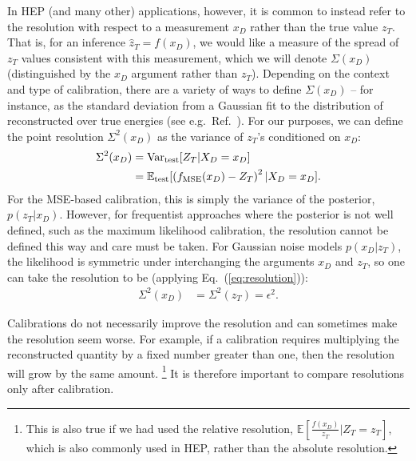 \documentclass[aps,prd,reprint,preprintnumbers,superscriptaddress,nofootinbib,longbibliography,floatfix]{revtex4-1}
\DeclareRobustCommand{\Eq}[1]{Eq.~(\ref{eq:#1})}
\DeclareRobustCommand{\Ref}[1]{Ref.~\cite{#1}}
\begin{document}
 
 In HEP (and many other) applications, however, it is common to instead refer to the resolution with respect to a measurement $x_D$ rather than the true value $z_T$. 
 That is, for an inference $\hat{z}_T = f(x_D)$, we would like a measure of the spread of $z_T$ values consistent with this measurement, which we will denote $\Sigma(x_D)$ (distinguished by the $x_D$ argument rather than $z_T$).
 Depending on the context and type of calibration, there are a variety of ways to define $\Sigma(x_D)$ -- for instance, as the standard deviation from a Gaussian fit to the distribution of reconstructed over true energies (see e.g.\ \Ref{1609.05195}).
 For our purposes, we can define the point resolution $\Sigma^2(x_D)$ as the variance of $z_T$'s conditioned on $x_D$:
 \begin{align}
     \Sigma^2(x_D) &=  {\rm Var}_{\rm test}[Z_T|X_D=x_D]\label{eq:point_resolution} \\
     &=  \mathbb{E}_{\rm test}[\left(f_{\rm MSE}(x_D) - Z_T\right)^2|X_D=x_D].\nonumber
 \end{align}
%
For the MSE-based calibration, this is simply the variance of the posterior, $p(z_T|x_D)$.
%
However, for frequentist approaches where the posterior is not well defined, such as the maximum likelihood calibration, the resolution cannot be defined this way and care must be taken.
%
For Gaussian noise models $p(x_D|z_T)$, the likelihood is symmetric under interchanging the arguments $x_D$ and $z_T$, so one can take the resolution to be (applying \Eq{resolution}):
%
\begin{align}
    \Sigma^2(x_D) &= \Sigma^2(z_T) = \epsilon^2. \label{eq:MLC_point_resolution}
\end{align}
 
 
 Calibrations do not necessarily improve the resolution and can sometimes make the resolution seem worse.
 For example, if a calibration requires multiplying the reconstructed quantity by a fixed number greater than one, then the resolution will grow by the same amount.%
 \footnote{This is also true if we had used the relative resolution, $\mathbb{E}\left[\frac{f(x_D)}{z_T} | Z_T = z_T\right]$, which is also commonly used in HEP, rather than the absolute resolution.}
 It is therefore important to compare resolutions only after calibration.
 
\end{document}
